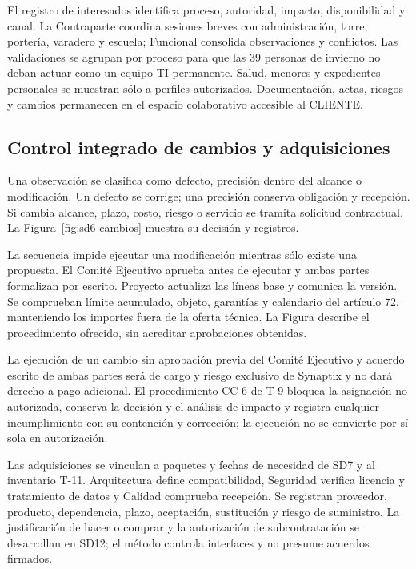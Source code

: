 El registro de interesados identifica proceso, autoridad, impacto, disponibilidad y canal. La Contraparte coordina sesiones breves con administración, torre, portería, varadero y escuela; Funcional consolida observaciones y conflictos. Las validaciones se agrupan por proceso para que las 39 personas de invierno no deban actuar como un equipo TI permanente. Salud, menores y expedientes personales se muestran sólo a perfiles autorizados. Documentación, actas, riesgos y cambios permanecen en el espacio colaborativo accesible al CLIENTE. \parencites[numerales 13.1--13.3, pp.~28--30]{sd6-c07}[RT-19.05/08, pp.~33--34]{sd6-bt}

\subsection{Control integrado de cambios y adquisiciones}
Una observación se clasifica como defecto, precisión dentro del alcance o modificación. Un defecto se corrige; una precisión conserva obligación y recepción. Si cambia alcance, plazo, costo, riesgo o servicio se tramita solicitud contractual. La Figura~\ref{fig:sd6-cambios} muestra su decisión y registros. \parencite[art.~72, p.~38]{sd6-ba}

La secuencia impide ejecutar una modificación mientras sólo existe una propuesta. El Comité Ejecutivo aprueba antes de ejecutar y ambas partes formalizan por escrito. Proyecto actualiza las líneas base y comunica la versión. Se comprueban límite acumulado, objeto, garantías y calendario del artículo 72, manteniendo los importes fuera de la oferta técnica. La Figura describe el procedimiento ofrecido, sin acreditar aprobaciones obtenidas.

La ejecución de un cambio sin aprobación previa del Comité Ejecutivo y acuerdo escrito de ambas partes será de cargo y riesgo exclusivo de Synaptix y no dará derecho a pago adicional. El procedimiento CC-6 de T-9 bloquea la asignación no autorizada, conserva la decisión y el análisis de impacto y registra cualquier incumplimiento con su contención y corrección; la ejecución no se convierte por sí sola en autorización. \parencite[art.~72, numerales 1--5, p.~38]{sd6-ba}

Las adquisiciones se vinculan a paquetes y fechas de necesidad de SD7 y al inventario T-11. Arquitectura define compatibilidad, Seguridad verifica licencia y tratamiento de datos y Calidad comprueba recepción. Se registran proveedor, producto, dependencia, plazo, aceptación, sustitución y riesgo de suministro. La justificación de hacer o comprar y la autorización de subcontratación se desarrollan en SD12; el método controla interfaces y no presume acuerdos firmados. \parencite[arts.~71--73, pp.~37--38]{sd6-ba}

